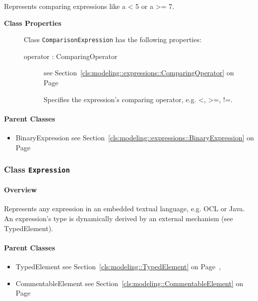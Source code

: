 	
			
Represents comparing expressions like a < 5 or a >= 7.	
		
	


\begin{description}

	\item[\textbf{Class Properties}] Class \texttt{ComparisonExpression} has the following properties:
	\begin{description}
\item[operator : ComparingOperator 	]
see Section~\ref{cls:modeling::expressions::ComparingOperator} on Page~\pageref{cls:modeling::expressions::ComparingOperator}
\hspace{\fill}
\nopagebreak


	
			
Specifies the expression's comparing operator, e.g. <, >=, !=.	
		
	
	\end{description}
	
	

\end{description}

\paragraph{Parent Classes}
\begin{itemize}
\item BinaryExpression see Section~\ref{cls:modeling::expressions::BinaryExpression} on Page~\pageref{cls:modeling::expressions::BinaryExpression}\end{itemize}
\subsubsection{\Large{Class \bfseries \texttt{Expression}\normalfont}}
\label{cls:modeling::expressions::Expression} 
\paragraph{Overview}

	
			
Represents any expression in an embedded textual language, e.g. OCL or Java. An expression's type is dynamically derived by an external mechanism (see TypedElement).	
		
	



\paragraph{Parent Classes}
\begin{itemize}
\item TypedElement see Section~\ref{cls:modeling::TypedElement} on Page~\pageref{cls:modeling::TypedElement}, \item CommentableElement see Section~\ref{cls:modeling::CommentableElement} on Page~\pageref{cls:modeling::CommentableElement}\end{itemize}

